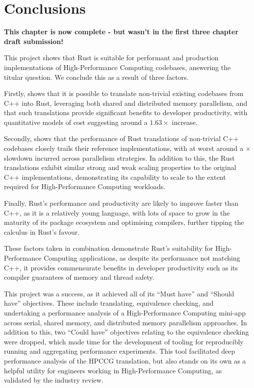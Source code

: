 \chapter{Conclusions}
\label{ch:conclusions} %

\textbf{This chapter is now complete - but wasn't in the first three chapter draft submission!}

This project shows that Rust is suitable for performant and production implementations of High-Performance Computing codebases, answering the titular question. We conclude this as a result of three factors.

Firstly,  shows that it is possible to translate non-trivial existing codebases from C++ into Rust, leveraging both shared and distributed memory parallelism, and that such translations provide significant benefits to developer productivity, with quantitative models of cost suggesting around a $1.63 \times$ increase.

Secondly,  shows that the performance of Rust translations of non-trivial C++ codebases closely trails their reference implementations, with at worst around a $\times$ slowdown incurred across parallelism strategies. In addition to this, the Rust translations exhibit similar strong and weak scaling properties to the original C++ implementations, demonstrating its capability to scale to the extent required for High-Performance Computing workloads.

Finally, Rust's performance and productivity are likely to improve faster than C++, as it is a relatively young language, with lots of space to grow in the maturity of its package ecosystem and optimising compilers, further tipping the calculus in Rust's favour.

These factors taken in combination demonstrate Rust's suitability for High-Performance Computing applications, as despite its performance not matching C++, it provides commensurate benefits in developer productivity such as its compiler guarantees of memory and thread safety.

This project was a success, as it achieved all of its ``Must have'' and ``Should have'' objectives. These include translating, equivalence checking, and undertaking a performance analysis of a High-Performance Computing mini-app across serial, shared memory, and distributed memory parallelism approaches. In addition to this, two ``Could have'' objectives relating to the equivalence checking were dropped, which made time for the development of tooling for reproducibly running and aggregating performance experiments. This tool facilitated deep performance analysis of the HPCCG translation, but also stands on its own as a helpful utility for engineers working in High-Performance Computing, as validated by the industry review.


